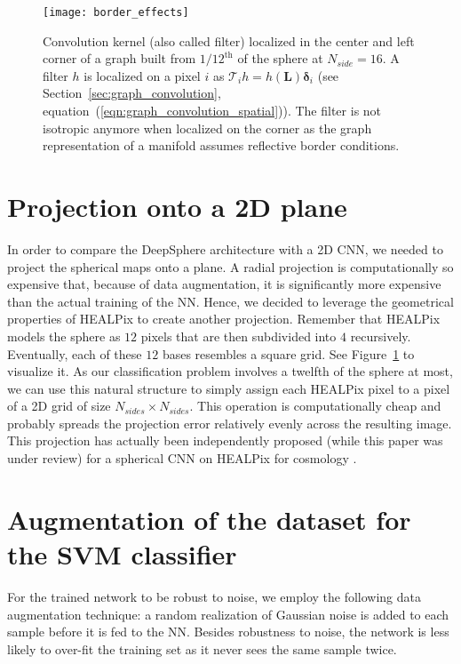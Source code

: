 \documentclass[final,twocolumn,3p,times,sort&compress]{elsarticle}
\newcommand{\figref}[1]{Figure~\ref{fig:#1}}
\newcommand{\secref}[1]{Section~\ref{sec:#1}}
\newcommand{\eqnref}[1]{(\ref{eqn:#1})}
\renewcommand{\b}[1]{{\bm{#1}}}   %
\newcommand{\1}{\b{1}}              %
\newcommand{\0}{\b{0}}              %
\renewcommand{\L}{\b{L}}
\newcommand{\T}{\mathcal{T}}
\begin{document}
\begin{figure}[ht!]
	\centering
	\texttt{[image: border\_effects]}
	\caption{Convolution kernel (also called filter) localized in the center and left corner of a graph built from $1/12^\text{th}$ of the sphere at $N_{side} = 16$.
		A filter $h$ is localized on a pixel $i$ as $\T_i h = h(\L) \b \delta_i$ (see \secref{graph_convolution}, equation~\eqnref{graph_convolution_spatial}).
	The filter is not isotropic anymore when localized on the corner as the graph representation of a manifold assumes reflective border conditions.}
	\label{fig:border_effects}
\end{figure}

\section{Projection onto a 2D plane}
\label{sec:projection}

In order to compare the DeepSphere architecture with a 2D CNN, we needed to project the spherical maps onto a plane.
A radial projection is computationally so expensive that, because of data augmentation, it is significantly more expensive than the actual training of the NN.
Hence, we decided to leverage the geometrical properties of HEALPix to create another projection.
Remember that HEALPix models the sphere as $12$ pixels that are then subdivided into $4$ recursively.
Eventually, each of these $12$ bases resembles a square grid.
See \figref{border_effects} to visualize it.
As our classification problem involves a twelfth of the sphere at most, we can use this natural structure to simply assign each HEALPix pixel to a pixel of a 2D grid of size $N_{sides} \times N_{sides}$.
This operation is computationally cheap and probably spreads the projection error relatively evenly across the resulting image.
This projection has actually been independently proposed (while this paper was under review) for a spherical CNN on HEALPix for cosmology \cite{krachmalnicoff2019convolutional}.

\section{Augmentation of the dataset for the SVM classifier}
\label{sec:dataset_augmentation}


For the trained network to be robust to noise, we employ the following data augmentation technique: a random realization of Gaussian noise is added to each sample before it is fed to the NN.
Besides robustness to noise, the network is less likely to over-fit the training set as it never sees the same sample twice.
\end{document}
